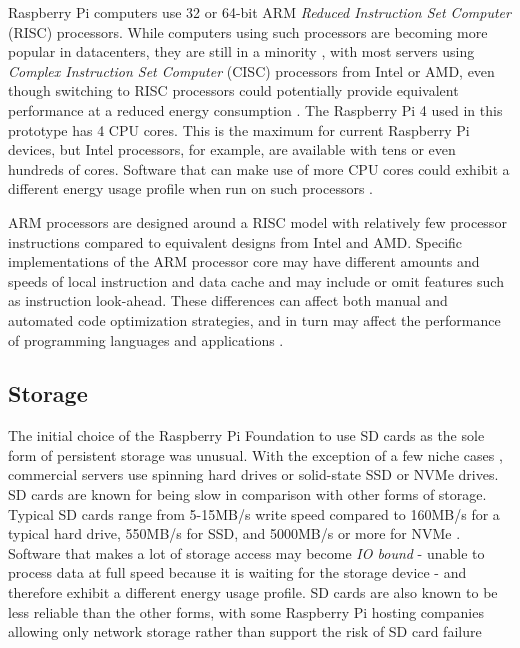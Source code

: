 Raspberry Pi computers use 32 or 64-bit ARM \emph{Reduced Instruction Set Computer} (RISC) processors. While computers using such processors are becoming more popular in datacenters, they are still in a minority  \citep{Korolov2022}, with most servers using \emph{Complex Instruction Set Computer} (CISC) processors from Intel or AMD, even though switching to RISC processors could potentially provide equivalent performance at a reduced energy consumption \citep{Varghese2015}. The Raspberry Pi 4 used in this prototype has 4 CPU cores. This is the maximum for current Raspberry Pi devices, but Intel processors, for example, are available with tens \citep{Intel2022} or even hundreds \citep{Intel2023} of cores. Software that can make use of more CPU cores could exhibit a different energy usage profile when run on such processors \citep{Basmadjian2012}.

ARM processors are designed around a RISC model with relatively few processor instructions compared to equivalent designs from Intel and AMD. Specific implementations of the ARM processor core may have different amounts and speeds of local instruction and data cache and may include or omit features such as instruction look-ahead. These differences can affect both manual and automated code optimization strategies, and in turn may affect the performance of \gls{programming language}s and applications \citep{Hartley2022}.

\subsection{Storage}

The initial choice of the Raspberry Pi Foundation to use SD cards as the sole form of persistent storage was unusual. With the exception of a few niche cases \citep{RaspberryHosting}, commercial servers use spinning hard drives or solid-state SSD or NVMe drives. SD cards are known for being slow in comparison with other forms of storage. Typical SD cards range from 5-15MB/s write speed compared to 160MB/s for a typical hard drive, 550MB/s for SSD, and 5000MB/s or more for NVMe \citep{Tekie.com}. Software that makes a lot of storage access may become \emph{IO bound} - unable to process data at full speed because it is waiting for the storage device - and therefore exhibit a different energy usage profile. SD cards are also known to be less reliable than the other forms, with some Raspberry Pi hosting companies allowing only network storage rather than support the risk of SD card failure \citep{MythicBeasts}

